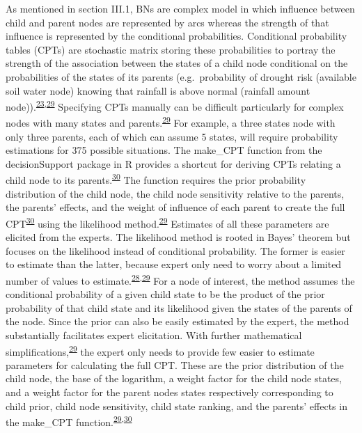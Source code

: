 \documentclass[12pt,oneside]{article}
\begin{document}
As mentioned in section III.1, BNs are complex model in which influence
between child and parent nodes are represented by arcs whereas the
strength of that influence is represented by the conditional
probabilities. Conditional probability tables (CPTs) are stochastic
matrix storing these probabilities to portray the strength of the
association between the states of a child node conditional on the
probabilities of the states of its parents (e.g.~probability of drought
risk (available soil water node) knowing that rainfall is above normal
(rainfall amount
node)).\textsuperscript{\protect\hyperlink{ref-Scutari_and_Denis_2015}{23},\protect\hyperlink{ref-Hansson_and_Sjokvist_2013}{29}}
Specifying CPTs manually can be difficult particularly for complex nodes
with many states and
parents.\textsuperscript{\protect\hyperlink{ref-Hansson_and_Sjokvist_2013}{29}}
For example, a three states node with only three parents, each of which
can assume 5 states, will require probability estimations for 375
possible situations. The make\_CPT function from the decisionSupport
package in R provides a shortcut for deriving CPTs relating a child node
to its
parents.\textsuperscript{\protect\hyperlink{ref-Luedeling_and_Goehring_2018}{30}}
The function requires the prior probability distribution of the child
node, the child node sensitivity relative to the parents, the parents'
effects, and the weight of influence of each parent to create the full
CPT\textsuperscript{\protect\hyperlink{ref-Luedeling_and_Goehring_2018}{30}}
using the likelihood
method.\textsuperscript{\protect\hyperlink{ref-Hansson_and_Sjokvist_2013}{29}}
Estimates of all these parameters are elicited from the experts. The
likelihood method is rooted in Bayes' theorem but focuses on the
likelihood instead of conditional probability. The former is easier to
estimate than the latter, because expert only need to worry about a
limited number of values to
estimate.\textsuperscript{\protect\hyperlink{ref-Whitney_et_al_2018a}{28},\protect\hyperlink{ref-Hansson_and_Sjokvist_2013}{29}}
For a node of interest, the method assumes the conditional probability
of a given child state to be the product of the prior probability of
that child state and its likelihood given the states of the parents of
the node. Since the prior can also be easily estimated by the expert,
the method substantially facilitates expert elicitation. With further
mathematical
simplifications,\textsuperscript{\protect\hyperlink{ref-Hansson_and_Sjokvist_2013}{29}}
the expert only needs to provide few easier to estimate parameters for
calculating the full CPT. These are the prior distribution of the child
node, the base of the logarithm, a weight factor for the child node
states, and a weight factor for the parent nodes states respectively
corresponding to child prior, child node sensitivity, child state
ranking, and the parents' effects in the make\_CPT
function.\textsuperscript{\protect\hyperlink{ref-Hansson_and_Sjokvist_2013}{29},\protect\hyperlink{ref-Luedeling_and_Goehring_2018}{30}}
\end{document}
